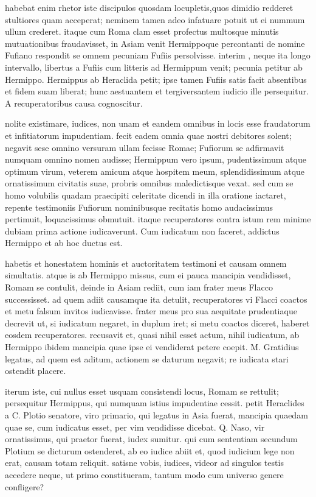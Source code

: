  habebat enim rhetor iste discipulos quosdam locupletis,quos dimidio redderet stultiores quam acceperat; neminem tamen adeo infatuare potuit ut ei nummum ullum crederet. itaque cum Roma clam esset profectus multosque minutis mutuationibus fraudavisset, in Asiam venit Hermippoque percontanti de nomine Fufiano respondit se omnem pecuniam Fufiis persolvisse. interim , neque ita longo intervallo, libertus a Fufiis cum litteris ad Hermippum venit; pecunia petitur ab Hermippo. Hermippus ab Heraclida petit; ipse tamen Fufiis satis facit absentibus et fidem suam liberat; hunc aestuantem et tergiversantem iudicio ille persequitur. A recuperatoribus causa cognoscitur.

 nolite existimare, iudices, non unam et eandem omnibus in locis esse fraudatorum et infitiatorum impudentiam. fecit eadem omnia quae nostri debitores solent; negavit sese omnino versuram ullam fecisse Romae; Fufiorum se adfirmavit numquam omnino nomen audisse; Hermippum vero ipsum, pudentissimum atque optimum virum, veterem amicum atque hospitem meum, splendidissimum atque ornatissimum civitatis suae, probris omnibus maledictisque vexat. sed cum se homo volubilis quadam praecipiti celeritate dicendi in illa oratione iactaret, repente testimoniis Fufiorum nominibusque recitatis homo audacissimus pertimuit, loquacissimus obmutuit. itaque recuperatores contra istum rem minime dubiam prima actione iudicaverunt. Cum iudicatum non faceret, addictus Hermippo et ab hoc ductus est.

 habetis et honestatem hominis et auctoritatem testimoni et causam omnem simultatis. atque is ab Hermippo missus, cum ei pauca mancipia vendidisset, Romam se contulit, deinde in Asiam rediit, cum iam frater meus Flacco successisset. ad quem adiit causamque ita detulit, recuperatores vi Flacci coactos et metu falsum invitos iudicavisse. frater meus pro sua aequitate prudentiaque decrevit ut, si iudicatum negaret, in duplum iret; si metu coactos diceret, haberet eosdem recuperatores. recusavit et, quasi nihil esset actum, nihil iudicatum, ab Hermippo ibidem mancipia quae ipse ei vendiderat petere coepit. M. Gratidius legatus, ad quem est aditum, actionem se daturum negavit; re iudicata stari ostendit placere.

 iterum iste, cui nullus esset usquam consistendi locus, Romam se rettulit; persequitur Hermippus, qui numquam istius impudentiae cessit. petit Heraclides a C. Plotio senatore, viro primario, qui legatus in Asia fuerat, mancipia quaedam quae se, cum iudicatus esset, per vim vendidisse dicebat. Q. Naso, vir ornatissimus, qui praetor fuerat, iudex sumitur. qui cum sententiam secundum Plotium se dicturum ostenderet, ab eo iudice abiit et, quod iudicium lege non erat, causam totam reliquit. satisne vobis, iudices, videor ad singulos testis accedere neque, ut primo constitueram, tantum modo cum universo genere confligere?

